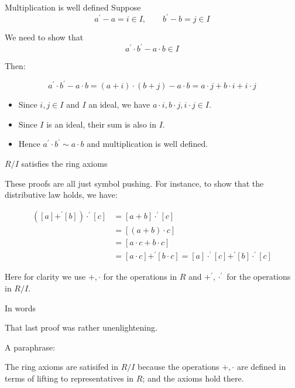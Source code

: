 \documentclass{beamer}
\begin{document}
\begin{frame}{Multiplication is well defined}
Suppose $$a^\prime-a=i\in I,\qquad b^\prime-b=j\in I$$  

We need to show that $$a^\prime\cdot b^\prime-a\cdot b\in I$$

Then:


$$a^\prime\cdot b^\prime-a\cdot b=(a+i)\cdot (b+j)-a\cdot b=a\cdot j+b\cdot i+i\cdot j$$

\begin{itemize}
\item Since $i, j\in I$ and $I$ an ideal, we have $a\cdot i, b\cdot j, i\cdot j\in I$. 
\item  Since $I$ is an ideal, their sum is also in $I$. 
\item  Hence $a^\prime\cdot b^\prime\sim a\cdot b$ and multiplication is well defined.
\end{itemize}

\end{frame}

\begin{frame}{$R/I$ satisfies the ring axioms}

These proofs are all just symbol pushing.  For instance, to show that the distributive law holds, we have:

\begin{align*}
([a]+^\prime[b])\cdot^\prime [c]& =[a+b]\cdot^\prime[c] \\
& =[(a+b)\cdot c] \\
&=[a\cdot c+b\cdot c] \\
&=[a\cdot c]+^\prime[b\cdot c]=[a]\cdot^\prime [c]+^\prime[b]\cdot^\prime [c]
\end{align*}

Here for clarity we use $+,\cdot$ for the operations in $R$ and $+^\prime, \cdot^\prime$ for the operations in $R/I$.
\end{frame}


\begin{frame}{In words}

That last proof was rather unenlightening. 
  
\begin{block}{ A paraphrase:}

The ring axioms are satisifed in $R/I$ because the operations $+, \cdot$ are defined in terms of lifting to representatives in $R$; and the axioms hold there.
\end{block}
\end{frame}
\end{document}
